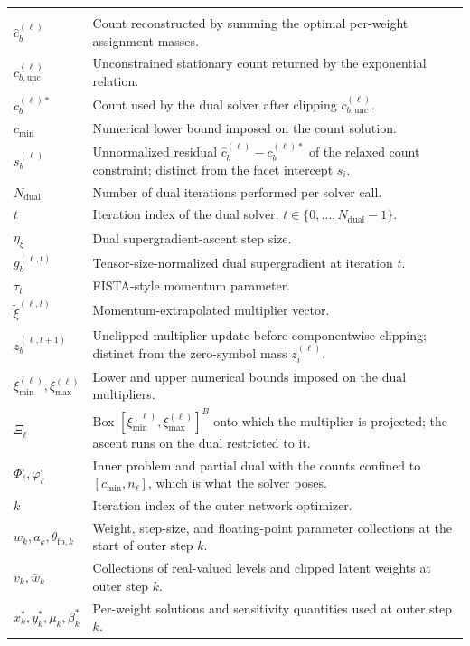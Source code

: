 \documentclass{article}
\begin{document}
\begin{longtable}{>{\raggedright\arraybackslash}p{}
                  >{\raggedright\arraybackslash}p{}}
  \addlinespace
  \multicolumn{2}{l}{\textit{Dual solver and optimization order}}\\*
  $\widehat c_b^{(\ell)}$ & Count reconstructed by summing the optimal per-weight assignment masses. \\
  $c_{b,\mathrm{unc}}^{(\ell)}$ & Unconstrained stationary count returned by the exponential relation. \\
  $c_b^{(\ell)*}$ & Count used by the dual solver after clipping $c_{b,\mathrm{unc}}^{(\ell)}$. \\
  $c_{\min}$ & Numerical lower bound imposed on the count solution. \\
  $s_b^{(\ell)}$ & Unnormalized residual $\widehat c_b^{(\ell)}-c_b^{(\ell)*}$ of the relaxed count constraint; distinct from the facet intercept $s_i$. \\
  $N_{\mathrm{dual}}$ & Number of dual iterations performed per solver call. \\
  $t$ & Iteration index of the dual solver, $t\in\{0,\ldots,N_{\mathrm{dual}}-1\}$. \\
  $\eta_\xi$ & Dual supergradient-ascent step size. \\
  $g_b^{(\ell,t)}$ & Tensor-size-normalized dual supergradient at iteration $t$. \\
  $\tau_t$ & FISTA-style momentum parameter. \\
  $\widetilde\xi^{(\ell,t)}$ & Momentum-extrapolated multiplier vector. \\
  $z_b^{(\ell,t+1)}$ & Unclipped multiplier update before componentwise clipping; distinct from the zero-symbol mass $z_i^{(\ell)}$. \\
  $\xi_{\min}^{(\ell)},\xi_{\max}^{(\ell)}$ & Lower and upper numerical bounds imposed on the dual multipliers. \\
  $\Xi_\ell$ & Box $[\xi_{\min}^{(\ell)},\xi_{\max}^{(\ell)}]^{B}$ onto which the multiplier is projected; the ascent runs on the dual restricted to it. \\
  $\Phi_\ell^{\square},\varphi_\ell^{\square}$ & Inner problem and partial dual with the counts confined to $[c_{\min},n_\ell]$, which is what the solver poses. \\
  $k$ & Iteration index of the outer network optimizer. \\
  $w_k,a_k,\theta_{\mathrm{fp},k}$ & Weight, step-size, and floating-point parameter collections at the start of outer step $k$. \\
  $v_k,\bar w_k$ & Collections of real-valued levels and clipped latent weights at outer step $k$. \\
  $x_k^*,y_k^*,\mu_k,\beta_k^*$ & Per-weight solutions and sensitivity quantities used at outer step $k$. \\


\end{longtable}
\end{document}
